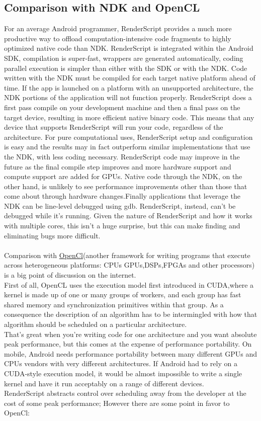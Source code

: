 \documentclass[11pt,english]{article}
\begin{document}
\subsection{Comparison with NDK and OpenCL}
For an average Android programmer, RenderScript provides a much more productive way to offload computation-intensive code fragments to highly optimized native code than NDK. RenderScript is integrated within the Android SDK, compilation is super-fast, wrappers are generated automatically, coding parallel execution is simpler than either with the SDK or with the NDK. Code written with the NDK must be compiled for each target native platform ahead of time. If the app is launched on a platform with an unsupported architecture, the NDK portions of the application will not function properly. RenderScript does a first pass compile on your development machine and then a final pass on the target device, resulting in more efficient native binary code. This means that any device that supports RenderScript will run your code, regardless of the architecture. For pure computational uses, RenderScript setup and configuration is easy and the results may in fact outperform similar implementations that use the NDK, with less coding necessary. RenderScript code may improve in the future as the final compile step improves and more hardware support and compute support are added for GPUs. Native code through the NDK, on the other hand, is unlikely to see performance improvements other than those that come about through hardware changes.Finally applications that leverage the NDK can be line-level debugged using gdb. RenderScript, instead, can't be debugged while it's running. Given the nature of RenderScript and how it works with multiple cores, this isn't a huge surprise, but this can make finding and eliminating bugs more difficult.\\\\Comparison with \href{https://www.khronos.org/opencl/}{OpenCl}(another framework for writing programs that execute across heterogeneous platforms: CPUs GPUs,DSPs,FPGAs and other processors) is a big point of discussion on the internet.\\First of all, OpenCL uses the execution model first introduced in CUDA,where a kernel is made up of one or many groups of workers, and each group has fast shared memory and synchronization primitives within that group. As a consequence the description of an algorithm has to be intermingled with how that algorithm should be scheduled on a particular architecture.\\That's great when you're writing code for one architecture and you want absolute peak performance, but this comes at the expense of performance portability. On mobile, Android needs performance portability between many different GPUs and CPUs vendors with very different architectures\cite{fr}. If Android had to rely on a CUDA-style execution model, it would be almost impossible to write a single kernel and have it run acceptably on a range of different devices.\\RenderScript abstracts control over scheduling away from the developer at the cost of some peak performance; However there are some point in favor to OpenCl:
\end{document}
